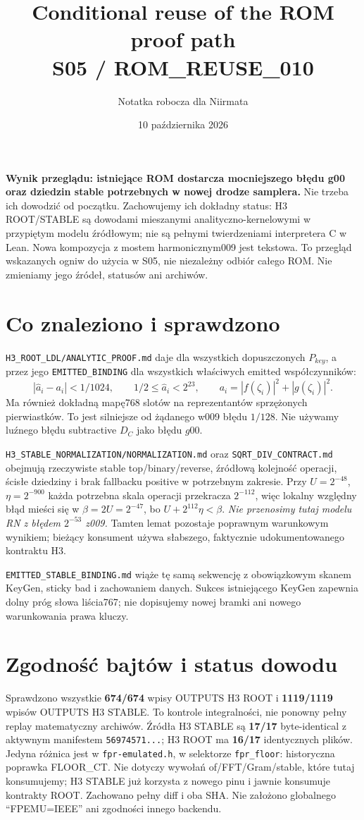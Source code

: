 \documentclass[11pt,a4paper]{article}
\title{Conditional reuse of the ROM proof path\\\large S05 / ROM\_REUSE\_010}
\author{Notatka robocza dla Niirmata}\date{10 października 2026}
\newcommand{\code}[1]{\nolinkurl{#1}}
\begin{document}
\maketitle
\textbf{Wynik przeglądu: istniejące ROM dostarcza mocniejszego błędu g00
oraz dziedzin stable potrzebnych w nowej drodze samplera.}
Nie trzeba ich dowodzić od początku. Zachowujemy ich dokładny status:
H3 ROOT/STABLE są dowodami mieszanymi analityczno-kernelowymi w przypiętym
modelu źródłowym; nie są pełnymi twierdzeniami interpretera C w Lean.
Nowa kompozycja z mostem harmonicznym009 jest tekstowa.
To przegląd wskazanych ogniw do użycia w S05, nie niezależny odbiór całego ROM.
Nie zmieniamy jego źródeł, statusów ani archiwów.

\section{Co znaleziono i sprawdzono}
\code{H3_ROOT_LDL/ANALYTIC_PROOF.md} daje dla wszystkich dopuszczonych
$P_{key}$, a przez jego \code{EMITTED_BINDING} dla wszystkich właściwych
emitted współczynników:
\[
 |\widehat a_i-a_i|<1/1024,\qquad
 1/2\le\widehat a_i<2^{23},\qquad
 a_i=|f(\zeta_i)|^2+|g(\zeta_i)|^2.
\]
Ma również dokładną mapę768 slotów na reprezentantów sprzężonych
pierwiastków. To jest silniejsze od żądanego w009 błędu $1/128$.
Nie używamy luźnego błędu subtractive $D_C$ jako błędu $g00$.

\code{H3_STABLE_NORMALIZATION/NORMALIZATION.md} oraz
\code{SQRT_DIV_CONTRACT.md} obejmują rzeczywiste stable top/binary/reverse,
źródłową kolejność operacji, ścisłe dziedziny i brak fallbacku positive
w potrzebnym zakresie. Przy $U=2^{-48}$, $\eta=2^{-900}$ każda potrzebna
skala operacji przekracza $2^{-112}$, więc lokalny względny błąd mieści się
w $\beta=2U=2^{-47}$, bo $U+2^{112}\eta<\beta$.
\emph{Nie przenosimy tutaj modelu RN z błędem $2^{-53}$ z009.}
Tamten lemat pozostaje poprawnym warunkowym wynikiem; bieżący konsument
używa słabszego, faktycznie udokumentowanego kontraktu H3.

\code{EMITTED_STABLE_BINDING.md} wiąże tę samą sekwencję z obowiązkowym
skanem KeyGen, sticky bad i zachowaniem danych. Sukces istniejącego KeyGen
zapewnia dolny próg słowa liścia767; nie dopisujemy nowej bramki ani
nowego warunkowania prawa kluczy.

\section{Zgodność bajtów i status dowodu}
Sprawdzono wszystkie \textbf{674/674} wpisy OUTPUTS H3 ROOT i
\textbf{1119/1119} wpisów OUTPUTS H3 STABLE. To kontrole integralności,
nie ponowny pełny replay matematyczny archiwów.
Źródła H3 STABLE są \textbf{17/17} byte-identical z aktywnym manifestem
\code{56974571...}; H3 ROOT ma \textbf{16/17} identycznych plików.
Jedyna różnica jest w \code{fpr-emulated.h}, w selektorze
\code{fpr_floor}: historyczna poprawka FLOOR\_CT. Nie dotyczy wywołań
of/FFT/Gram/stable, które tutaj konsumujemy; H3 STABLE już korzysta z nowego
pinu i jawnie konsumuje kontrakty ROOT. Zachowano pełny diff i oba SHA.
Nie założono globalnego ``FPEMU=IEEE'' ani zgodności innego backendu.
\end{document}
